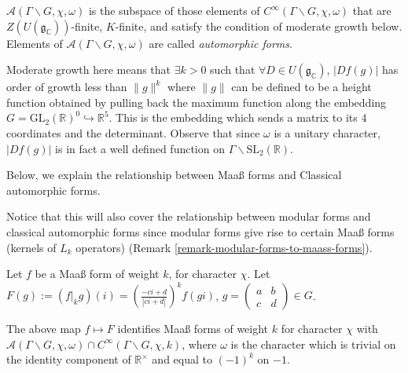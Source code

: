 \begin{definition}
\label{definition-classical-automorphic-forms}
	$\mathcal{A}(\Gamma \backslash G, \chi, \omega)$ is the subspace of those elements of $C^{\infty}(\Gamma \backslash G, \chi, \omega)$ that are $Z(U(\mathfrak{g}_\mathbb{C}))$-finite, $K$-finite, and satisfy the condition of moderate growth below. Elements of $\mathcal{A}(\Gamma \backslash G, \chi, \omega)$ are called \textit{automorphic forms}.
	
	Moderate growth here means that $\exists k > 0$ such that $\forall D \in U(\mathfrak{g}_\mathbb{C})$, $|Df(g)|$ has order of growth less than $\lVert g \rVert^{k}$ where $\lVert g \rVert$ can be defined to be a height function obtained by pulling back the maximum function along the embedding $G = \text{GL}_2({\mathbb{R}})^0 \hookrightarrow \mathbb{R}^{5}$. This is the embedding which sends a matrix to its $4$ coordinates and the determinant. Observe that since $\omega$ is a unitary character,  $|Df(g)|$ is in fact a well defined function on $\Gamma\backslash \text{SL}_2(\mathbb{R})$. 
\end{definition} 



Below, we explain the relationship between Maa{\ss} forms and Classical automorphic forms.
\begin{remark}
\label{remark-also-holomorphic}
	Notice that this will also cover the relationship between modular forms and classical automorphic forms since modular forms give rise to certain Maa{\ss} forms (kernels of $L_k$ operators) (Remark \ref{remark-modular-forms-to-maass-forms}).
\end{remark}

Let $f$ be a Maa{\ss} form of weight $k$, for character $\chi$. Let $F(g) := (f|_k g)(i) = \left(\frac{-ci + d}{|ci + d|}\right)^{k} f(gi)$, $g = \begin{pmatrix}  a & b \\ c& d \end{pmatrix} \in G$.

\begin{proposition}
\label{proposition-Maass-automorphic}
	The above map $f \mapsto F$ identifies Maa{\ss} forms of weight $k$ for character $\chi$ with $\mathcal{A}(\Gamma \backslash G, \chi, \omega) \cap C^{\infty}(\Gamma \backslash G, \chi, k)$, where $\omega$ is the character which is trivial on the identity component of $\mathbb{R}^{\times}$ and equal to $(-1)^{k}$ on $-1$.
\end{proposition}

